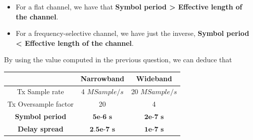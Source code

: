 \documentclass[frenchb, oneside, headings=normal]{scrartcl}
\begin{document}
\begin{itemize}
\item For a flat channel, we have that \textbf{Symbol period > Effective length of the channel}.
\item For a frequency-selective channel, we have just the inverse, \textbf{Symbol period < Effective length of the channel}.

\end{itemize}

By using the value computed in the previous question, we can deduce that

\begin{center}
	\begin{tabular}{c|c|c}
		  & Narrowband & Wideband\\
		  \hline
	Tx Sample rate & 4 $MSample/s$ & 20 $MSample/s$ \\	  
	Tx Oversample factor & 20 & 4\\
	\textbf{Symbol period} &  $\textbf{5e-6~s}$ & $\textbf{2e-7~s}$ \\ 
	\textbf{Delay spread}  &  $\textbf{2.5e-7~s}$ & $\textbf{1e-7~s}$ \\
	\end{tabular}
	\label{tab1}
\end{center} 

\end{document}
